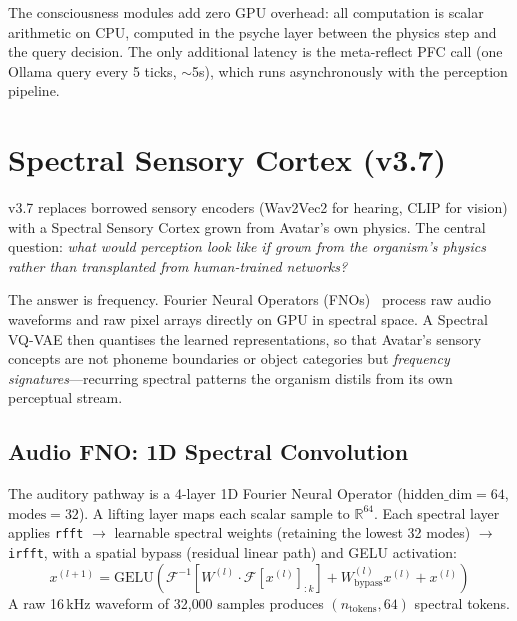 \documentclass[11pt,a4paper,twocolumn]{article}
\begin{document}
The consciousness modules add zero GPU overhead: all computation is scalar arithmetic on CPU, computed in the psyche layer between the physics step and the query decision.
The only additional latency is the meta-reflect PFC call (one Ollama query every 5 ticks, $\sim$5s), which runs asynchronously with the perception pipeline.

\section{Spectral Sensory Cortex (v3.7)}
\label{sec:senses}

v3.7 replaces borrowed sensory encoders (Wav2Vec2 for hearing, CLIP for vision) with a
Spectral Sensory Cortex grown from Avatar's own physics. The central question: \emph{what
would perception look like if grown from the organism's physics rather than transplanted from
human-trained networks?}

The answer is frequency. Fourier Neural Operators (FNOs)~\cite{fno2020} process raw audio
waveforms and raw pixel arrays directly on GPU in spectral space. A Spectral VQ-VAE then
quantises the learned representations, so that Avatar's sensory concepts are not phoneme
boundaries or object categories but \emph{frequency signatures}---recurring spectral
patterns the organism distils from its own perceptual stream.

\subsection{Audio FNO: 1D Spectral Convolution}

The auditory pathway is a 4-layer 1D Fourier Neural Operator
($\mathrm{hidden\_dim}=64$, $\mathrm{modes}=32$).
A lifting layer maps each scalar sample to $\mathbb{R}^{64}$. Each spectral layer applies
\texttt{rfft} $\to$ learnable spectral weights (retaining the lowest 32 modes) $\to$
\texttt{irfft}, with a spatial bypass (residual linear path) and GELU activation:
\begin{equation}
x^{(l+1)} = \mathrm{GELU}\!\left(\mathcal{F}^{-1}\!\left[W^{(l)} \cdot \mathcal{F}[x^{(l)}]_{:k}\right] + W_{\mathrm{bypass}}^{(l)} x^{(l)} + x^{(l)}\right)
\end{equation}
A raw 16\,kHz waveform of 32{,}000 samples produces $(n_{\mathrm{tokens}}, 64)$ spectral tokens.
\end{document}
